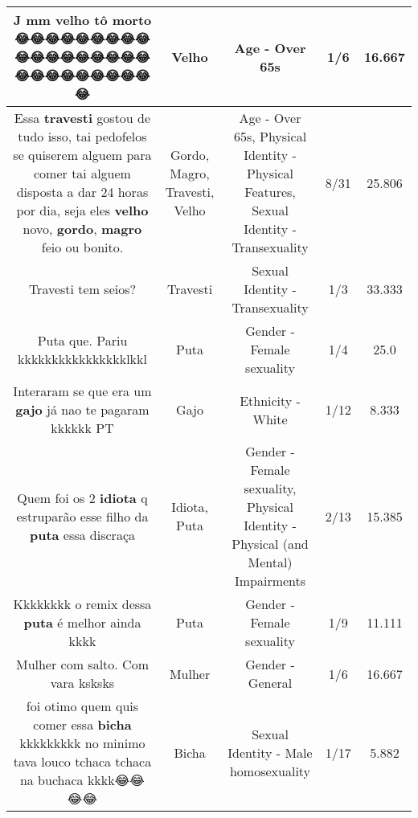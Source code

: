 \documentclass[11pt]{article}
\newlength\mylength
\begin{document}
\begin{center}
\begin{longtable}{|C{.65\mylength}|C{.30\mylength}|C{.12\mylength}|C{.12\mylength}|C{.12\mylength}|}
  \small J mm \textbf{velho} tô morto 😂😂😂😂😂😂😂😂😂😂😂😂😂😂😂😂😂😂😂😂😂😂😂😂😂😂😂😂\normalsize   & Velho & Age - Over 65s & 1/6 & 16.667 \\  \hline
  \small Essa \textbf{travesti} gostou de tudo isso, tai pedofelos se quiserem alguem para comer tai alguem disposta a dar 24 horas por dia,  seja eles \textbf{velho} novo, \textbf{gordo}, \textbf{magro} feio ou bonito.\normalsize   & Gordo, Magro, Travesti, Velho & Age - Over 65s, Physical Identity - Physical Features, Sexual Identity - Transexuality & 8/31 & 25.806 \\  \hline
  \small Travesti tem seios?\normalsize   & Travesti & Sexual Identity - Transexuality & 1/3 & 33.333 \\  \hline
  \small Puta que. Pariu kkkkkkkkkkkkkkkklkkl\normalsize   & Puta & Gender - Female sexuality & 1/4 & 25.0 \\  \hline
  \small Interaram se que era um \textbf{gajo} já nao te pagaram kkkkkk PT\normalsize   & Gajo & Ethnicity - White & 1/12 & 8.333 \\  \hline
  \small Quem foi os 2 \textbf{idiota} q estruparão esse filho da \textbf{puta} essa discraça\normalsize   & Idiota, Puta & Gender - Female sexuality, Physical Identity - Physical (and Mental) Impairments & 2/13 & 15.385 \\  \hline
  \small Kkkkkkkk o remix dessa \textbf{puta} é melhor ainda kkkk\normalsize   & Puta & Gender - Female sexuality & 1/9 & 11.111 \\  \hline
  \small Mulher com salto. Com vara ksksks\normalsize   & Mulher & Gender - General & 1/6 & 16.667 \\  \hline
  \small foi otimo quem quis comer essa \textbf{bicha} kkkkkkkkk no minimo tava louco tchaca tchaca na buchaca kkkk😂😂😂😂\normalsize   & Bicha & Sexual Identity - Male homosexuality & 1/17 & 5.882 \\  \hline

\end{longtable}
\end{center}
\end{document}
